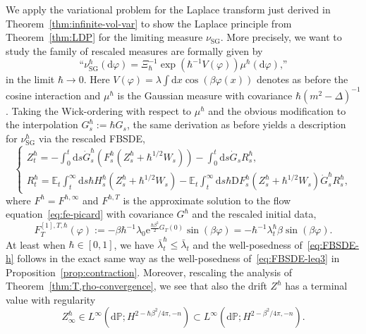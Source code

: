 \documentclass[11pt, a4paper]{scrartcl}
\numberwithin{equation}{section}
\theoremstyle{plain}
\theoremstyle{remark}
\newcommand{\assign}{:=}
\newcommand{\mathD}{\mathrm{D}}
\newcommand{\mathd}{\mathrm{d}}
\newcommand{\mathe}{\mathrm{e}}
\newcommand{\tmop}[1]{\ensuremath{\operatorname{#1}}}
\begin{document}
We apply the variational problem for the Laplace transform just derived in
Theorem~\ref{thm:infinite-vol-var} to show the Laplace principle from
Theorem~\ref{thm:LDP} for the limiting measure $\nu_{\tmop{SG}}$. More
precisely, we want to study the family of rescaled measures are formally given
by
\begin{equation}
	\text{``}\nu_{\tmop{SG}}^{\hbar} (\mathd \varphi) = \Xi_{\hbar}^{- 1} \exp
	(\hbar^{- 1} V (\varphi)) \mu^{\hbar} (\mathd \varphi)\text{,''}
	\label{eq:def-SGh}
\end{equation}
in the limit $\hbar \rightarrow 0$. Here $V (\varphi) = \lambda \int \mathd x
	\cos (\beta \varphi (x))$ denotes as before the cosine interaction and
$\mu^{\hbar}$ is the Gaussian measure with covariance $\hbar (m^2 - \Delta)^{-
		1}$. Taking the Wick-ordering with respect to $\mu^{\hbar}$ and the obvious
modification to the interpolation $G_s^{\hbar} \assign \hbar G_s$, the same
derivation as before yields a description for $\nu_{\tmop{SG}}^{\hbar}$ via
the rescaled FBSDE,
\begin{equation}
	\begin{cases}
		Z^{\hbar}_t = - \int_0^t \mathd s \dot{G}_s^{\hbar} (F^{\hbar}_s
		(Z^{\hbar}_s + \hbar^{1 / 2} W_s)) - \int_0^t \mathd s \dot{G}_s
		R^{\hbar}_s, \\
		R^{\hbar}_t =\mathbb{E}_t \int_t^{\infty} \mathd s \hbar H^{\hbar}_s
		(Z^{\hbar}_s + \hbar^{1 / 2} W_s) -\mathbb{E}_t \int_t^{\infty} \mathd s
		\hbar \mathD F^{\hbar}_s (Z^{\hbar}_s + \hbar^{1 / 2} W_s)
		\dot{G}^{\hbar}_s R^{\hbar}_s,
	\end{cases} \label{eq:FBSDE-h}
\end{equation}
where $F^{\hbar} = F^{\hbar, \infty}$ and $F^{\hbar, T}$ is the approximate
solution to the flow equation~\eqref{eq:fe-picard} with covariance $G^{\hbar}$
and the rescaled initial data,
\[ F_T^{[1], T, \hbar} (\varphi) \assign - \beta \hbar^{- 1} \lambda_0
	\mathe^{\frac{\hbar \beta^2}{2} G_T (0)} \sin (\beta \varphi) = - \hbar^{-
		1} \lambda_t^{\hbar} \beta \sin (\beta \varphi) . \]
At least when $\hbar \in [0, 1]$, we have $\bar{\lambda}^{\hbar}_t \leqslant
	\bar{\lambda}_t$ and the well-posedness of~\eqref{eq:FBSDE-h} follows in the exact
same way as the well-posedness of~\eqref{eq:FBSDE-leq3} in
Proposition~\ref{prop:contraction}. Moreover, rescaling the analysis of
Theorem~\ref{thm:T,rho-convergence}, we see that also the drift $Z^{\hbar}$
has a terminal value with regularity
\begin{equation}
	Z^{\hbar}_{\infty} \in L^{\infty} (\mathd \mathbb{P} ; H^{2 - \hbar \beta^2 / 4 \pi,
			- n}) \subset L^{\infty} (\mathd \mathbb{P} ; H^{2 - \beta^2 / 4 \pi, - n}) .
	\label{eq:Zh-infty}
\end{equation}
\end{document}
